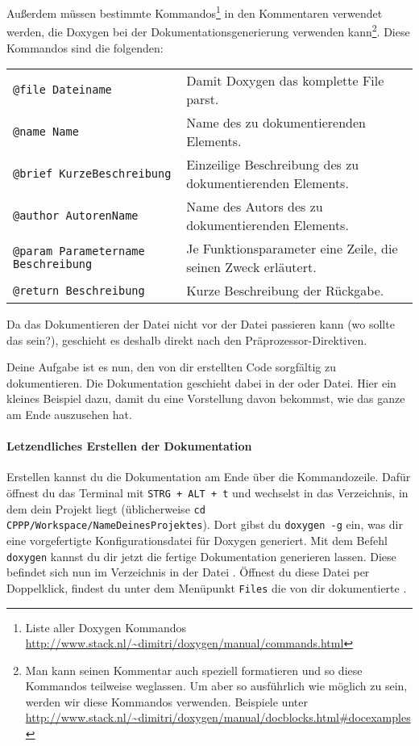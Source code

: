 Außerdem müssen bestimmte Kommandos\footnote{Liste aller Doxygen Kommandos \url{http://www.stack.nl/~dimitri/doxygen/manual/commands.html}} in den Kommentaren verwendet werden, die Doxygen bei der Dokumentationsgenerierung verwenden kann\footnote{Man kann seinen Kommentar auch speziell formatieren und so diese Kommandos teilweise weglassen.
Um aber so ausführlich wie möglich zu sein, werden wir diese Kommandos verwenden.
Beispiele unter \url{http://www.stack.nl/~dimitri/doxygen/manual/docblocks.html\#docexamples}}.
Diese Kommandos sind die folgenden:

\medskip
    \begin{tabular}{ll}
        {\lstinline!@file Dateiname!} & Damit Doxygen das komplette File parst. \\
        {\lstinline!@name Name!} & Name des zu dokumentierenden Elements. \\
        {\lstinline!@brief KurzeBeschreibung!} & Einzeilige Beschreibung des zu dokumentierenden Elements. \\
        {\lstinline!@author AutorenName!} & Name des Autors des zu dokumentierenden Elements. \\
        {\lstinline!@param Parametername Beschreibung!} & Je Funktionsparameter eine Zeile, die seinen Zweck erläutert. \\
        {\lstinline!@return Beschreibung!} & Kurze Beschreibung der Rückgabe. \\
    \end{tabular}
\medskip

Da das Dokumentieren der Datei nicht vor der Datei passieren kann (wo sollte das sein?), geschieht es deshalb direkt nach den Präprozessor-Direktiven.

Deine Aufgabe ist es nun, den von dir erstellten Code sorgfältig zu dokumentieren.
Die Dokumentation geschieht dabei in der  oder  Datei. 
Hier ein kleines Beispiel dazu, damit du eine Vorstellung davon bekommst, wie das ganze am Ende auszusehen hat.


\paragraph{Letzendliches Erstellen der Dokumentation}
Erstellen kannst du die Dokumentation am Ende über die Kommandozeile.
Dafür öffnest du das Terminal mit \lstinline{STRG + ALT + t} und wechselst in das Verzeichnis, in dem dein Projekt liegt (üblicherweise \lstinline{cd CPPP/Workspace/NameDeinesProjektes}).
Dort gibst du \lstinline{doxygen -g} ein, was dir eine vorgefertigte Konfigurationsdatei für Doxygen generiert. 
Mit dem Befehl \lstinline{doxygen} kannst du dir jetzt die fertige Dokumentation generieren lassen.
Diese befindet sich nun im Verzeichnis  in der Datei .
Öffnest du diese Datei per Doppelklick, findest du unter dem Menüpunkt \lstinline{Files} die von dir dokumentierte .

